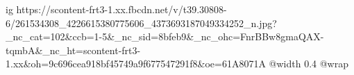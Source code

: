  
 
 
 
 

\ifcmt
  ig https://scontent-frt3-1.xx.fbcdn.net/v/t39.30808-6/261534308_4226615380775606_4373693187049334252_n.jpg?_nc_cat=102&ccb=1-5&_nc_sid=8bfeb9&_nc_ohc=FnrBBw8gmaQAX-tqmbA&_nc_ht=scontent-frt3-1.xx&oh=9c696cea918bf45749a9f677547291f8&oe=61A8071A
  @width 0.4
  @wrap 
\fi

